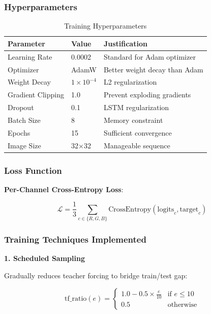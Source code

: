 \documentclass[12pt,a4paper]{article}
\begin{document}
\subsubsection{Hyperparameters}

\begin{table}[H]
\centering
\caption{Training Hyperparameters}
\begin{tabular}{@{}llp{6cm}@{}}
\toprule
\textbf{Parameter} & \textbf{Value} & \textbf{Justification} \\ \midrule
Learning Rate & 0.0002 & Standard for Adam optimizer \\
Optimizer & AdamW & Better weight decay than Adam \\
Weight Decay & $1 \times 10^{-4}$ & L2 regularization \\
Gradient Clipping & 1.0 & Prevent exploding gradients \\
Dropout & 0.1 & LSTM regularization \\
Batch Size & 8 & Memory constraint \\
Epochs & 15 & Sufficient convergence \\
Image Size & 32×32 & Manageable sequence \\ \bottomrule
\end{tabular}
\end{table}

\subsubsection{Loss Function}

\textbf{Per-Channel Cross-Entropy Loss}:

\begin{equation}
\mathcal{L} = \frac{1}{3} \sum_{c \in \{R,G,B\}} \text{CrossEntropy}(\text{logits}_c, \text{target}_c)
\end{equation}

\subsubsection{Training Techniques Implemented}

\textbf{1. Scheduled Sampling} \cite{scheduled_sampling}

Gradually reduces teacher forcing to bridge train/test gap:

\begin{equation}
\text{tf\_ratio}(e) = \begin{cases} 
1.0 - 0.5 \times \frac{e}{10} & \text{if } e \leq 10 \\
0.5 & \text{otherwise}
\end{cases}
\end{equation}
\end{document}
